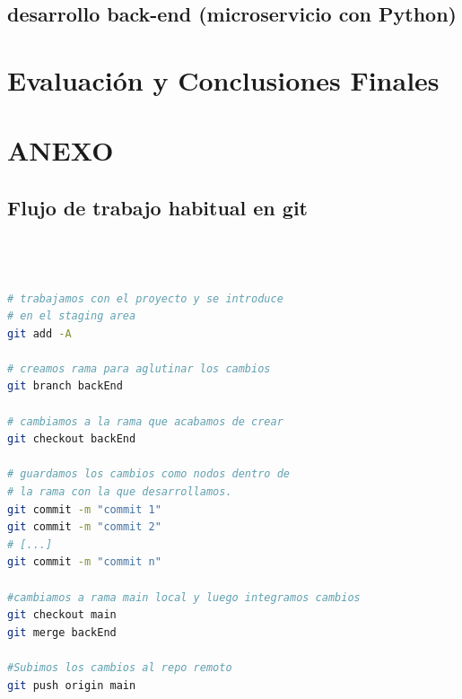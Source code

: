 \documentclass[a4paper,12pt]{report}
\begin{document}
		
	\section{desarrollo back-end (microservicio con Python)}
		
		
	\chapter{Evaluación y Conclusiones Finales} %
	

	
	
	
	

	
	
	
	
	
	
	
	
	
	
	
	
	
	
	
	
	
	
	
	
	
	
	
	
	
	
	
	
	
	
	
	
	
	
	
	
	
	
	
	
	\chapter{ANEXO}
	\label{chap:anexo} %
		
			
		\section{Flujo de trabajo habitual en git}
		\label{sec:anexoFlujoGit}
		
\begin{lstlisting}[language=bash, basicstyle=\ttfamily\small]
	


# trabajamos con el proyecto y se introduce
# en el staging area
git add -A 

# creamos rama para aglutinar los cambios
git branch backEnd

# cambiamos a la rama que acabamos de crear
git checkout backEnd

# guardamos los cambios como nodos dentro de
# la rama con la que desarrollamos.	
git commit -m "commit 1"  	
git commit -m "commit 2"
# [...]
git commit -m "commit n"

#cambiamos a rama main local y luego integramos cambios
git checkout main
git merge backEnd

#Subimos los cambios al repo remoto
git push origin main 

	
\end{lstlisting}
		
\end{document}
